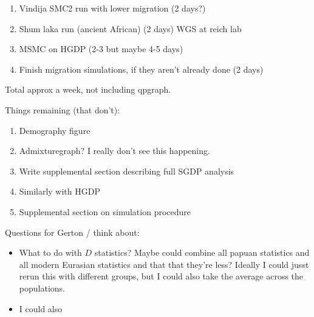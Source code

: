 \documentclass{article}
\begin{document}
\begin{enumerate}
	\item Vindija SMC2 run with lower migration (2 days?)
	\item Shum laka run (ancient African) (2 days) WGS at reich lab
	\item MSMC on HGDP (2-3 but maybe 4-5 days)
	\item Finish migration simulations, if they aren't already done (2 days)
\end{enumerate}

Total approx a week, not including qpgraph.

Things remaining (that don't):

\begin{enumerate}
	\item Demography figure
	\item Admixturegraph? I really don't see this happening.
	\item Write supplemental section describing full SGDP analysis
	\item Similarly with HGDP
	\item Supplemental section on simulation procedure
\end{enumerate}

Questions for Gerton / think about:

\begin{itemize}
	\item What to do with $D$ statistics? Maybe could combine all papuan statistics and all modern Eurasian statistics and that that they're less? Ideally I could jusst rerun this with different groups, but I could also take the average across the populations.
	\item I could also 

\end{itemize}

\newpage

\maketitle
\end{document}
